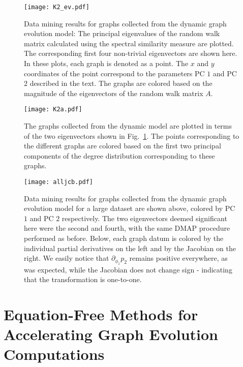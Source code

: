 \begin{figure}
  \begin{center}
    \texttt{[image: K2\_ev.pdf]}
    \caption{\label{fig:K2} Data mining results for graphs collected
      from the dynamic graph evolution model: The principal
      eigenvalues of the random walk matrix calculated using the
      spectral similarity measure are plotted.  The corresponding
      first four non-trivial eigenvectors are shown here. In these
      plots, each graph is denoted as a point.  The $x$ and $y$
      coordinates of the point correspond to the parameters PC $1$ and
      PC $2$ described in the text.  The graphs are colored based on
      the magnitude of the eigenvectors of the random walk matrix $A$.
    }
  \end{center}
\end{figure}


\begin{figure}
  \begin{center}
    \texttt{[image: K2a.pdf]}
    \caption{\label{fig:K2a} The graphs collected from the dynamic
      model are plotted in terms of the two eigenvectors shown in
      Fig.~\ref{fig:K2}. The points corresponding to the different
      graphs are colored based on the first two principal components
      of the degree distribution corresponding to these graphs.  }
  \end{center}
\end{figure}

\begin{figure}
  \begin{center}
    \texttt{[image: alljcb.pdf]}
    \caption{\label{fig:J} Data mining results for graphs collected
      from the dynamic graph evolution model for a large dataset are
      shown above, colored by PC $1$ and PC $2$ respectively. The two
      eigenvectors deemed significant here were the second and fourth,
      with the same DMAP procedure performed as before. Below, each
      graph datum is colored by the individual partial derivatives on
      the left and by the Jacobian on the right. We easily notice that
      $\partial_{\phi_1} p_2$ remains positive everywhere, as was
      expected, while the Jacobian does not change sign - indicating
      that the transformation is one-to-one.  }
  \end{center}
\end{figure}


\section{\label{sec: ef} Equation-Free Methods for Accelerating Graph
  Evolution Computations}


